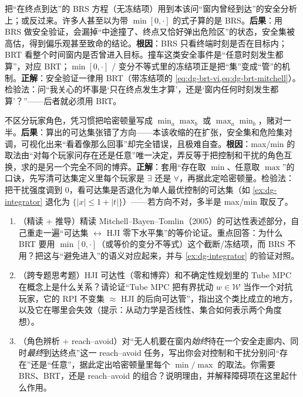 \begin{pitfall}
把“在终点到达”的 BRS 方程（无冻结项）用到本该问“窗内曾经到达”的安全分析上；或反过来。许多人甚至以为带 $\min[0,\cdot]$ 的式子算的是 BRS。\textbf{后果}：用 BRS 做安全验证，会漏掉“中途撞了、终点又恰好弹出危险区”的状态，安全集被高估，得到偏乐观甚至致命的结论。\textbf{根因}：BRS 只看终端时刻是否在目标内；BRT 看整个时间窗内是否曾进入目标。撞车这类安全事件是“任意时刻发生都算”，对应 BRT；$\min[0,\cdot]$ / 变分不等式里的冻结项正是把“集”变成“管”的机制。\textbf{正解}：安全验证一律用 BRT（带冻结项的 \cref{eq:dg-brt-vi,eq:dg-brt-mitchell}）。检验法：问“我关心的坏事是‘只在终点发生才算’，还是‘窗内任何时刻发生都算’？”——后者就必须用 BRT。
\end{pitfall}

\begin{pitfall}
不区分玩家角色，凭习惯把哈密顿量写成 $\min_a\max_b$ 或 $\max_a\min_b$，赌对一半。\textbf{后果}：算出的可达集张错了方向——本该收缩的在扩张，安全集和危险集对调，可视化出来“看着像那么回事”却完全错误，且极难自查。\textbf{根因}：max/min 的取法由“对每个玩家问存在还是任意”唯一决定，弄反等于把控制和干扰的角色互换，求的是另一个完全不同的博弈。\textbf{正解}：套用“存在取 $\min$、任意取 $\max$”的口诀，先写清可达集定义里每个玩家是 $\exists$ 还是 $\forall$，再据此定哈密顿量。检验法：把干扰强度调到 0，看可达集是否退化为单人最优控制的可达集（如 \cref{ex:dg-integrator} 退化为 $\{|x|\le1+|t|\}$）——若方向不对，多半是 max/min 取反了。
\end{pitfall}

\begin{practice}
\begin{enumerate}
  \item （精读 + 推导）精读 Mitchell--Bayen--Tomlin（2005）的可达性表述部分，自己重走一遍“可达集 $\leftrightarrow$ HJI 零下水平集”的等价论证。重点回答：为什么 BRT 要用 $\min[0,\cdot]$（或等价的变分不等式）这个截断/冻结项，而 BRS 不用？把这与“避免进入”的语义对应起来，并与 \cref{ex:dg-integrator} 的验证对照。
  \item （跨专题思考题）HJI 可达性（零和博弈）和不确定性规划里的 Tube MPC 在概念上是什么关系？请论证“Tube MPC 把有界扰动 $w\in\mathcal{W}$ 当作一个对抗玩家，它的 RPI 不变集 $\approx$ HJI 的后向可达管”，指出这个类比成立的地方，以及它在哪里会失效（提示：从动力学是否线性、集合如何表示两个角度想）。
  \item （角色辨析 + reach--avoid）对“无人机要在窗内\emph{始终}待在一个安全走廊内、同时\emph{最终}到达终点”这一 reach--avoid 任务，写出你会对控制和干扰分别问“存在”还是“任意”，据此定出哈密顿量里每个 $\min/\max$ 的取法。你需要 BRS、BRT，还是 reach--avoid 的组合？说明理由，并解释障碍项在这里起什么作用。
\end{enumerate}
\end{practice}

